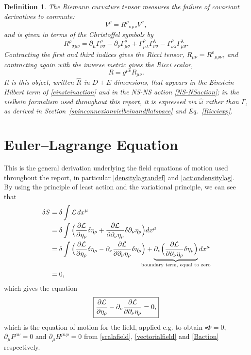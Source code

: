 \documentclass{article}
\newtheorem{definition}{Definition}
\begin{document}
\begin{definition} \label{app:riemann}
    The Riemann curvature tensor measures the failure of covariant derivatives to commute:
    \begin{equation}
        [\nabla_\mu, \nabla_\nu]V^\rho = R^\rho{}_{\sigma \mu \nu}V^\sigma,
    \end{equation}
    and is given in terms of the Christoffel symbols by
    \begin{equation}
        R^\rho{}_{\sigma\mu\nu} = \partial_\mu \Gamma^\rho_{\nu\sigma} - \partial_\nu \Gamma^\rho_{\mu\sigma} + \Gamma^\rho_{\mu\lambda}\Gamma^\lambda_{\nu\sigma} - \Gamma^\rho_{\nu\lambda}\Gamma^\lambda_{\mu\sigma}.
    \end{equation}
    Contracting the first and third indices gives the Ricci tensor, $R_{\mu\nu} = R^\rho{}_{\mu\rho\nu}$, and contracting again with the inverse metric gives the Ricci scalar,
    \begin{equation}
        R = g^{\mu\nu}R_{\mu\nu}.
    \end{equation}
    It is this object, written $\hat R$ in $D+E$ dimensions, that appears in the Einstein--Hilbert term of \eqref{einsteinaction} and in the NS-NS action \eqref{NS-NSaction}; in the vielbein formalism used throughout this report, it is expressed via $\hat\omega$ rather than $\Gamma$, as derived in Section~\ref{spinconnexionvielbeinandflatspace} and Eq.~\eqref{Ricciexp}.
\end{definition}

\section{Euler--Lagrange Equation} \label{Euler-Lag}
This is the general derivation underlying the field equations of motion used throughout the report, in particular \eqref{densitylagrandef} and \eqref{actiondensitylag}.\\
By using the principle of least action and the variational principle, we can see that
\begin{align*}
    \delta S &= \delta \int \mathcal{L} \, dx^\mu \\
    & = \delta \int \Big(\pdv{\mathcal{L}}{\eta_{\rho}} \delta \eta_{\rho} + \pdv{\mathcal{L}}{\partial_{\nu}\eta_{\rho}} \delta \partial_ \nu \eta_{\rho}\Big)  dx^\mu\\
    & = \delta \int \Big(\pdv{\mathcal{L}}{\eta_{\rho}} \delta \eta_{\rho}- \partial_ \nu \pdv{\mathcal{L}}{\partial_{\nu}\eta_{\rho}} \delta  \eta_{\rho}\Big)  + \underbrace{\partial_ \nu \Big(\pdv{\mathcal{L}}{\partial_{\nu}\eta_{\rho}} \delta  \eta_{\rho}\Big)}_{\mathclap{\text{boundary term, equal to zero}}}  dx^\mu\\
    & = 0,
\end{align*}
which gives the equation
\begin{equation}
    \boxed{\pdv{\mathcal{L}}{\eta_{\rho}} - \partial_ \nu \pdv{\mathcal{L}}{\partial_{\nu}\eta_{\rho}} = 0,}
\end{equation}
which is the equation of motion for the field, applied e.g. to obtain $\square\Phi=0$, $\partial_\mu F^{\mu\nu}=0$ and $\partial_\mu H^{\mu\nu\rho}=0$ from \eqref{scalafield}, \eqref{vectorialfield} and \eqref{Baction} respectively.
\end{document}
